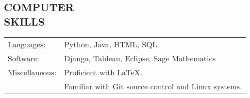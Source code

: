 \documentclass[line,margin]{res}
\begin{document}
\begin{resume}
\vspace*{.2cm} 

\section{COMPUTER \\ SKILLS}

\begin{tabular}{l l}
   \underline{Languages:} & Python, Java, HTML, SQL\\
   \underline{Software:} & Django, Tableau, Eclipse, Sage Mathematics\\
   \underline{Miscellaneous:} & Proficient with LaTeX. \\
                              &  Familiar with Git source control and Linux systems.
  \end{tabular}


\end{resume}
\end{document}
